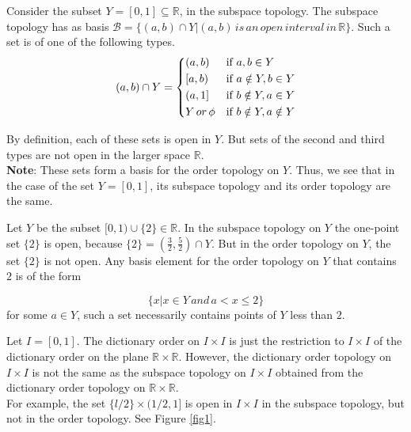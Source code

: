 \documentclass[a4paper,english,12pt]{article}
\begin{document}
\begin{exmp}
	Consider the subset $Y = [0,1] \subseteq \mathbb{R}$, in the subspace topology. The subspace topology has as basis $\mathcal{B}=\{(a,b) \cap Y | (a,b) \, is\, an\, open\, interval\, in\, \mathbb{R}\}$. Such a set is of one of the following types.
	\[ (a,b)\cap Y = 
		\begin{dcases*}
	(a,b) & if  $a,b \in Y$\\
	[a,b) & if  $a \notin Y, b \in Y$\\
	(a,1] & if  $b \notin Y, a \in Y$\\
	Y \, or \, \phi & if  $b \notin Y, a \notin Y$\\
		\end{dcases*}  
	\]
	
	By definition, each of these sets is open in $Y$. But sets of the second and third types are not open in the larger space $\mathbb{R}$.\\ 
	\textbf{Note}: These sets form a basis for the order topology on $Y$. Thus, we see that in the case of the set $Y = [0,1]$, its subspace topology and its order topology are the same.
\end{exmp}

\begin{exmp}
	Let $Y$ be the subset $[0, 1) \cup \{2\} \in \mathbb{R}$. In the subspace topology on $Y$ the	one-point set $\{2\}$ is open, because $\{2\} = (\frac{3}{2} , \frac{5}{2} ) \cap Y$. But in the order topology on $Y$, the set $\{2\}$ is not open. Any basis element for the order topology 	on $Y$ that contains $2$ is of the form
	
	\[ \{ x | x \in Y \, and \, a < x \leq 2 \} \]
	for some $a \in Y$, such a set necessarily contains points of $Y$ less than $2$.
\end{exmp}

\begin{exmp}
	Let $I = [0,1]$. The dictionary order on $I \times I$ is just the restriction to $I \times I$ of the dictionary order on the plane $\mathbb{R} \times \mathbb{R}$. However, the dictionary order topology
	on $I \times I$ is not the same as the subspace topology on $I \times I$ obtained from the dictionary order topology on $\mathbb{R} \times \mathbb{R}$. \\
	For example, the set $\{l/2\} \times (1/2, 1]$ is open in $I \times I$ in the subspace topology, but not in the order topology. See Figure \ref{fig1}.
	
\end{exmp}
\end{document}
